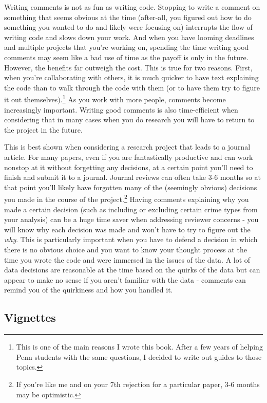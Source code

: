 \documentclass[
]{krantz}
\begin{document}
Writing comments is not as fun as writing code. Stopping to
write a comment on something that seems obvious at the time
(after-all, you figured out how to do something you wanted
to do and likely were focusing on) interrupts the flow of
writing code and slows down your work. And when you have
looming deadlines and multiple projects that you're working
on, spending the time writing good comments may seem like a
bad use of time as the payoff is only in the future.
However, the benefits far outweigh the cost. This is true
for two reasons. First, when you're collaborating with
others, it is much quicker to have text explaining the code
than to walk through the code with them (or to have them try
to figure it out themselves).\footnote{This is one of the
  main reasons I wrote this book. After a few years of
  helping Penn students with the same questions, I decided
  to write out guides to those topics.} As you work with
more people, comments become increasingly important. Writing
good comments is also time-efficient when considering that
in many cases when you do research you will have to return
to the project in the future.

This is best shown when considering a research project that
leads to a journal article. For many papers, even if you are
fantastically productive and can work nonstop at it without
forgetting any decisions, at a certain point you'll need to
finish and submit it to a journal. Journal reviews can often
take 3-6 months so at that point you'll likely have
forgotten many of the (seemingly obvious) decisions you made
in the course of the project.\footnote{If you're like me and
  on your 7th rejection for a particular paper, 3-6 months
  may be optimistic.} Having comments explaining why you
made a certain decision (such as including or excluding
certain crime types from your analysis) can be a huge time
saver when addressing reviewer concerns - you will know why
each decision was made and won't have to try to figure out
the \emph{why}. This is particularly important when you have
to defend a decision in which there is no obvious choice and
you want to know your thought process at the time you wrote
the code and were immersed in the issues of the data. A lot
of data decisions are reasonable at the time based on the
quirks of the data but can appear to make no sense if you
aren't familiar with the data - comments can remind you of
the quirkiness and how you handled it.

\hypertarget{vignettes}{%
\subsection{Vignettes}\label{vignettes}}
\end{document}
